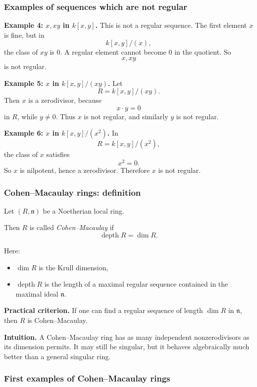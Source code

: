 \documentclass[12pt,a4paper]{article}
\theoremstyle{notespace}
\DeclareMathOperator{\depth}{depth}
\begin{document}
\subsubsection{Examples of sequences which are not regular}

\textbf{Example 4: \(x,xy\) in \(k[x,y]\).}
This is not a regular sequence. The first element \(x\) is fine, but in
\[
k[x,y]/(x),
\]
the class of \(xy\) is \(0\). A regular element cannot become \(0\) in the quotient. So
\[
x,xy
\]
is not regular.

\medskip

\textbf{Example 5: \(x\) in \(k[x,y]/(xy)\).}
Let
\[
R=k[x,y]/(xy).
\]
Then \(x\) is a zerodivisor, because
\[
x\cdot y=0
\]
in \(R\), while \(y\neq 0\). Thus \(x\) is not regular, and similarly \(y\) is not regular.

\medskip

\textbf{Example 6: \(x\) in \(k[x,y]/(x^2)\).}
In
\[
R=k[x,y]/(x^2),
\]
the class of \(x\) satisfies
\[
x^2=0.
\]
So \(x\) is nilpotent, hence a zerodivisor. Therefore \(x\) is not regular.

\subsubsection{Cohen--Macaulay rings: definition}

Let \((R,\mathfrak n)\) be a Noetherian local ring.

Then \(R\) is called \emph{Cohen--Macaulay} if
\[
\depth R=\dim R.
\]

Here:
\begin{itemize}
	\item \(\dim R\) is the Krull dimension,
	\item \(\depth R\) is the length of a maximal regular sequence contained in the maximal ideal \(\mathfrak n\).
\end{itemize}

\medskip

\textbf{Practical criterion.}
If one can find a regular sequence of length \(\dim R\) in \(\mathfrak n\), then \(R\) is Cohen--Macaulay.

\medskip

\textbf{Intuition.}
A Cohen--Macaulay ring has as many independent nonzerodivisors as its dimension permits. It may still be singular, but it behaves algebraically much better than a general singular ring.

\subsubsection{First examples of Cohen--Macaulay rings}
\end{document}
